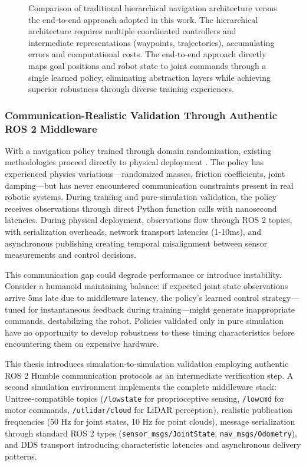 \documentclass[12pt,a4paper]{article}
\begin{document}
\begin{figure}[H]
\begin{tikzpicture}
\end{tikzpicture}
\caption[Hirearchical Navigation vs End-to-End approach]{Comparison of traditional hierarchical navigation architecture versus the end-to-end approach adopted in this work. The hierarchical architecture requires multiple coordinated controllers and intermediate representations (waypoints, trajectories), accumulating errors and computational costs. The end-to-end approach directly maps goal positions and robot state to joint commands through a single learned policy, eliminating abstraction layers while achieving superior robustness through diverse training experiences.}
\label{fig:architecture_comparison}
\end{figure}

\subsubsection{Communication-Realistic Validation Through Authentic ROS 2 Middleware}

With a navigation policy trained through domain randomization, existing methodologies proceed directly to physical deployment \parencite{gu2024humanoidgym}. The policy has experienced physics variations—randomized masses, friction coefficients, joint damping—but has never encountered communication constraints present in real robotic systems. During training and pure-simulation validation, the policy receives observations through direct Python function calls with nanosecond latencies. During physical deployment, observations flow through ROS 2 topics, with serialization overheads, network transport latencies (1-10ms), and asynchronous publishing creating temporal misalignment between sensor measurements and control decisions.

This communication gap could degrade performance or introduce instability. Consider a humanoid maintaining balance: if expected joint state observations arrive 5ms late due to middleware latency, the policy's learned control strategy—tuned for instantaneous feedback during training—might generate inappropriate commands, destabilizing the robot. Policies validated only in pure simulation have no opportunity to develop robustness to these timing characteristics before encountering them on expensive hardware.

This thesis introduces simulation-to-simulation validation employing authentic ROS 2 Humble communication protocols as an intermediate verification step. A second simulation environment implements the complete middleware stack: Unitree-compatible topics (\texttt{/lowstate} for proprioceptive sensing, \texttt{/lowcmd} for motor commands, \texttt{/utlidar/cloud} for LiDAR perception), realistic publication frequencies (50 Hz for joint states, 10 Hz for point clouds), message serialization through standard ROS 2 types (\texttt{sensor\_msgs/JointState}, \texttt{nav\_msgs/Odometry}), and DDS transport introducing characteristic latencies and asynchronous delivery patterns.
\end{document}
